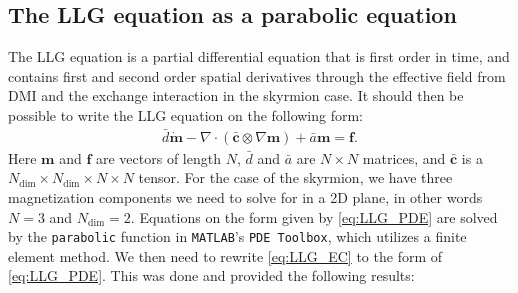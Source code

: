 \subsection{The LLG equation as a parabolic equation}
The LLG equation is a partial differential equation that is first order in time, and contains first and second order spatial derivatives through the effective field from DMI and the exchange interaction in the skyrmion case. It should then be possible to write the LLG equation on the following form:
\begin{align}
\label{eq:LLG_PDE}
\bar{d}\mathbold{\dot{m}} - \nabla\cdot(\mathbold{\bar{c}}\otimes\nabla \mathbold{m}) + \bar{a}\mathbold{m} = \mathbold{f}.
\end{align}
Here $\mathbold{m}$ and $\mathbold{f}$ are vectors of length $N$, $\bar{d}$ and $\bar{a}$ are $N\times N$ matrices, and $\mathbold{\bar{c}}$ is a $N_{\textrm{dim}}\times N_{\textrm{dim}} \times N\times N$ tensor. For the case of the skyrmion, we have three magnetization components we need to solve for in a 2D plane, in other words $N = 3$ and $N_{\textrm{dim}}=2$. Equations on the form given by \eqref{eq:LLG_PDE} are solved by the \texttt{parabolic} function in \texttt{MATLAB}'s \texttt{PDE Toolbox}, which utilizes a finite element method. We then need to rewrite \eqref{eq:LLG_EC} to the form of \eqref{eq:LLG_PDE}. This was done and provided the following results:

